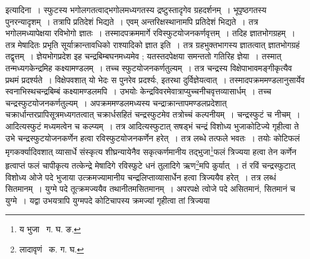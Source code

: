\documentclass[11pt, openany]{book}
\begin{document}
\noindent इत्यादिना~। स्फुटस्य भगोलगतत्वाद्भगोलमध्यगतस्य द्रष्टुस्तादृगेव ग्रहदर्शनम्~। भूपृष्ठगतस्य पुनरन्यादृशम्~। 
तत्रापि प्रतिदेशं भिद्यते~। एवम् अन्तरिक्षस्थानामपि प्रतिदेशं भिद्यते~। तत्र भगोलमध्यापेक्षया रविभोगो ज्ञातः~। तस्मादपक्रममार्गे रविस्फुटयोजनकर्णवृत्तम्~। तदिह ज्ञातभोगग्रहम्~। तत्र मेषादितः प्रभृति सूर्याक्रान्तावधिको राश्यादिको ज्ञात इति~। तत्र 
ग्रहभुक्तभागस्य ज्ञातत्वात् ज्ञातभोगग्रहं तद्वृत्तम्~। ज्ञेयभोगप्रदेश इह चन्द्रबिम्बघनमध्यमेव ; यतस्तदपेक्षया समन्ततो गतिरिह ज्ञेया~। तस्मात् तन्मध्यगकेन्द्रमिह कक्ष्यामण्डलम्~। तच्च स्फुटयोजनकर्णतुल्यम्~। तत्र चन्द्रस्य विक्षेपाभावमङ्गीकृत्यैव प्रथमं प्रदर्श्यते~। विक्षेपवशात् यो भेदः स पुनरेव प्रदर्श्यः, इतरथा दुर्विज्ञेयत्वात्~। तस्मादपक्रममण्डलानुसार्येव स्वनाभिस्थचन्द्रबिम्बं कक्ष्यामण्डलमपि~। उभयोः केन्द्रविवरमेवात्राप्युच्चनीचवृत्तव्यासार्धम्~। तच्च चन्द्रस्फुटयोजनकर्णतुल्यम्~। अपक्रममण्डलमध्यस्य चन्द्राक्रान्तापमण्डलप्रदेशात् चक्रार्धान्तरप्रापिसूत्रमध्यगतत्वात् चक्रार्धसहितं चन्द्रस्फुटमेव तत्रोच्चं कल्पनीयम्~। चन्द्रस्फुटं च नीचम्~। आदित्यस्फुटं मध्यमत्वेन च कल्प्यम्~। तत्र आदित्यस्फुटात् सषड्भं चन्द्रं विशोध्य भुजाकोटिज्ये गृहीत्वा ते उभे चन्द्रस्फुटयोजनकर्णेन हत्वा रविस्फुटयोजनकर्णेन हरेत्~। तत्र लब्धे तत्फले भवतः~। तयोः कोटिफलं मृगकर्क्यादिवशात् व्यासार्धे संस्कृत्य शीघ्रन्यायेनैव सकृत्कर्णमानीय तद्भुजा\renewcommand{\thefootnote}{१}\footnote{य भुजा \textendash\ ग. घ. ङ.}फलं त्रिज्यया हत्वा तेन कर्णेन हृत्वाप्तं फलं चापीकृत्य तत्केन्द्रे मेषादिगे रविस्फुटे धनं तुलादिगे ऋण\renewcommand{\thefootnote}{१}\footnote{लादावृणं  \textendash\ क. ग. घ.}मपि कुर्यात्~। तं रविं चन्द्रस्फुटात् विशोध्य ओजे पदे भुजाया उत्क्रमज्यामानीय चन्द्रलिप्ताव्यासार्धेन हत्वा त्रिज्ययैव हरेत्~। तत्र लब्धं सितमानम्~। युग्मे पदे तूत्क्रमज्ययैव 
तथानीतमसितमानम्~। अपरपक्षे त्वोजे पदे असितमानं, सितमानं च युग्मे~। यद्वा उभयत्रापि युग्मपदे कोटिचापस्य क्रमज्यां गृहीत्वा तां त्रिज्यया 

\newpage
\end{document}
